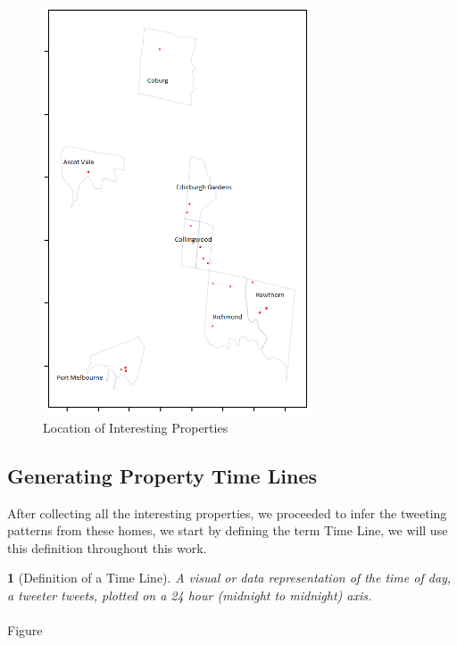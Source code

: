 \documentclass[12pt]{report}
\theoremstyle{named}
\newtheorem*{namedtheorem}{}
\begin{document}
\begin{figure}[ht]
\centering
        \includegraphics[width=80mm,scale=1]{Images/FilteredInterestingProperties.png}
    \caption{Location of Interesting Properties}
    \label{fig:Location of Interesting Properties}
\end{figure}

\subsection{Generating Property Time Lines}
After collecting all the interesting properties, we proceeded to infer the tweeting patterns from these homes, we start by defining the term Time Line, we will use this definition throughout this work.
\begin{namedtheorem}[Definition of a Time Line] A visual or data representation of the time of day, a tweeter tweets, plotted on a 24 hour (midnight to midnight) axis.
\end{namedtheorem}
\paragraph{}
Figure 
\end{document}
